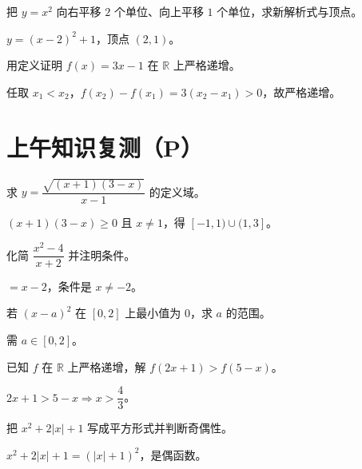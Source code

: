 \begin{problem}
把 $y=x^2$ 向右平移 $2$ 个单位、向上平移 $1$ 个单位，求新解析式与顶点。
\end{problem}
\begin{solution}
$y=(x-2)^2+1$，顶点 $(2,1)$。
\end{solution}

\begin{problem}
用定义证明 $f(x)=3x-1$ 在 $\mathbb{R}$ 上严格递增。
\end{problem}
\begin{solution}
任取 $x_1<x_2$，$f(x_2)-f(x_1)=3(x_2-x_1)>0$，故严格递增。
\end{solution}

\section{上午知识复测（P）}

\begin{problem}
求 $y=\dfrac{\sqrt{(x+1)(3-x)}}{x-1}$ 的定义域。
\end{problem}
\begin{solution}
$(x+1)(3-x)\ge0$ 且 $x\ne1$，得 $[-1,1)\cup(1,3]$。
\end{solution}

\begin{problem}
化简 $\dfrac{x^2-4}{x+2}$ 并注明条件。
\end{problem}
\begin{solution}
$=x-2$，条件是 $x\ne-2$。
\end{solution}

\begin{problem}
若 $(x-a)^2$ 在 $[0,2]$ 上最小值为 $0$，求 $a$ 的范围。
\end{problem}
\begin{solution}
需 $a\in[0,2]$。
\end{solution}

\begin{problem}
已知 $f$ 在 $\mathbb{R}$ 上严格递增，解 $f(2x+1)>f(5-x)$。
\end{problem}
\begin{solution}
$2x+1>5-x\Rightarrow x>\dfrac43$。
\end{solution}

\begin{problem}
把 $x^2+2|x|+1$ 写成平方形式并判断奇偶性。
\end{problem}
\begin{solution}
$x^2+2|x|+1=(|x|+1)^2$，是偶函数。
\end{solution}

